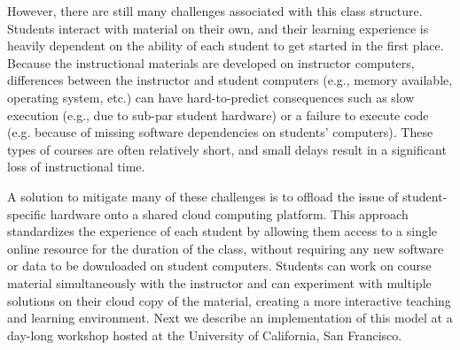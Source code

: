 However, there are still many challenges associated with this class structure.
Students interact with material on their own, and their learning experience is
heavily dependent on the ability of each student to get started in the first
place. Because the instructional materials are developed on instructor
computers, differences between the instructor and student computers (e.g., memory
available, operating system, etc.) can have hard-to-predict consequences such
as slow execution (e.g., due to sub-par student hardware) or a failure to
execute code (e.g. because of missing software dependencies on
students' computers). These types of courses are often relatively short,
and small delays result in a significant loss of instructional time.

A solution to mitigate many of these challenges is to offload the issue of
student-specific hardware onto a shared cloud computing platform. This approach
standardizes the experience of each student by allowing them access to a single
online resource for the duration of the class, without requiring any new
software or data to be downloaded on student computers. Students can work
on course material simultaneously with the instructor and can
experiment with multiple solutions on their cloud copy of the material,
creating a more interactive teaching and learning environment. Next we describe
an implementation of this model at a day-long workshop hosted at the
University of California, San Francisco.
